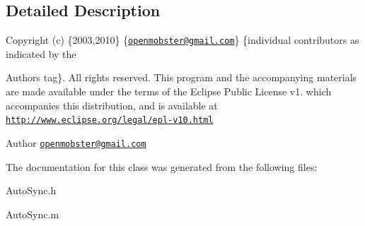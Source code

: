 \subsection{\-Detailed \-Description}
\-Copyright (c) \{2003,2010\} \{\href{mailto:openmobster@gmail.com}{\tt openmobster@gmail.\-com}\} \{individual contributors as indicated by the \begin{DoxyAuthor}{\-Authors}
tag\}. \-All rights reserved. \-This program and the accompanying materials are made available under the terms of the \-Eclipse \-Public \-License v1. which accompanies this distribution, and is available at \href{http://www.eclipse.org/legal/epl-v10.html}{\tt http\-://www.\-eclipse.\-org/legal/epl-\/v10.\-html}
\end{DoxyAuthor}
\begin{DoxyAuthor}{\-Author}
\href{mailto:openmobster@gmail.com}{\tt openmobster@gmail.\-com} 
\end{DoxyAuthor}


\-The documentation for this class was generated from the following files\-:\begin{DoxyCompactItemize}
\item 
\-Auto\-Sync.\-h\item 
\-Auto\-Sync.\-m\end{DoxyCompactItemize}
